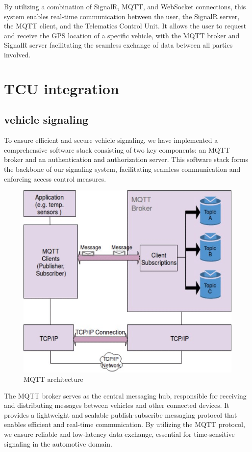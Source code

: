 \documentclass[
12pt,
oneside, 
onehalfspacing, 
nolistspacing, 
parskip, 
chapterinoneline, 
]{AASTCOMPUTER}
\begin{document}
By utilizing a combination of SignalR, MQTT, and WebSocket connections, this system enables real-time communication between the user, the SignalR server, the MQTT client, and the Telematics Control Unit. It allows the user to request and receive the GPS location of a specific vehicle, with the MQTT broker and SignalR server facilitating the seamless exchange of data between all parties involved.

\chapter{TCU integration}
\section{vehicle signaling}
To ensure efficient and secure vehicle signaling, we have implemented a comprehensive software stack consisting of two key components: an MQTT broker and an authentication and authorization server. This software stack forms the backbone of our signaling system, facilitating seamless communication and enforcing access control measures.


\begin{figure}[!ht]
	\centering
	\includegraphics[scale=0.5]{Figures/Architicture/mqtt.png}
  	\caption{MQTT architecture}
  	\label{fig:MQTT architecture}
\end{figure}


The MQTT broker serves as the central messaging hub, responsible for receiving and distributing messages between vehicles and other connected devices. It provides a lightweight and scalable publish-subscribe messaging protocol that enables efficient and real-time communication. By utilizing the MQTT protocol, we ensure reliable and low-latency data exchange, essential for time-sensitive signaling in the automotive domain.
\end{document}
